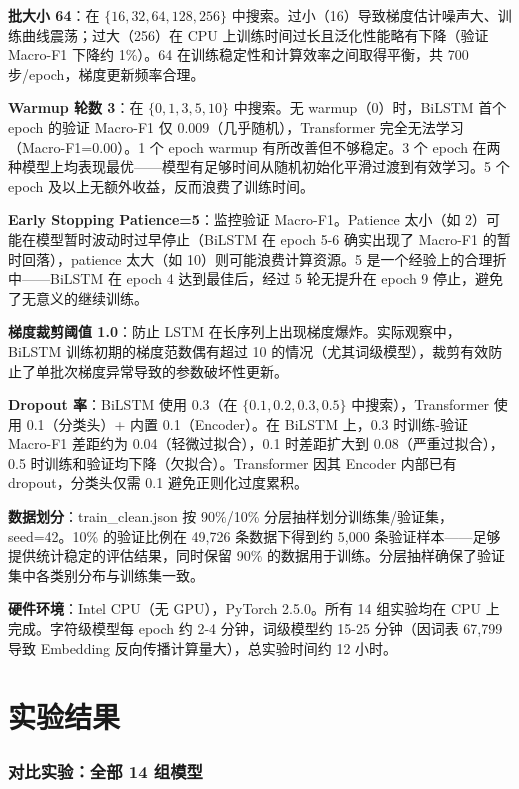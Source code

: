 \textbf{批大小 64}：在 $\{16, 32, 64, 128, 256\}$ 中搜索。过小（16）导致梯度估计噪声大、训练曲线震荡；过大（256）在 CPU 上训练时间过长且泛化性能略有下降（验证 Macro-F1 下降约 1\%）。64 在训练稳定性和计算效率之间取得平衡，共 700 步/epoch，梯度更新频率合理。

\textbf{Warmup 轮数 3}：在 $\{0, 1, 3, 5, 10\}$ 中搜索。无 warmup（0）时，BiLSTM 首个 epoch 的验证 Macro-F1 仅 0.009（几乎随机），Transformer 完全无法学习（Macro-F1=0.00）。1 个 epoch warmup 有所改善但不够稳定。3 个 epoch 在两种模型上均表现最优——模型有足够时间从随机初始化平滑过渡到有效学习。5 个 epoch 及以上无额外收益，反而浪费了训练时间。

\textbf{Early Stopping Patience=5}：监控验证 Macro-F1。Patience 太小（如 2）可能在模型暂时波动时过早停止（BiLSTM 在 epoch 5-6 确实出现了 Macro-F1 的暂时回落），patience 太大（如 10）则可能浪费计算资源。5 是一个经验上的合理折中——BiLSTM 在 epoch 4 达到最佳后，经过 5 轮无提升在 epoch 9 停止，避免了无意义的继续训练。

\textbf{梯度裁剪阈值 1.0}：防止 LSTM 在长序列上出现梯度爆炸。实际观察中，BiLSTM 训练初期的梯度范数偶有超过 10 的情况（尤其词级模型），裁剪有效防止了单批次梯度异常导致的参数破坏性更新。

\textbf{Dropout 率}：BiLSTM 使用 0.3（在 $\{0.1,0.2,0.3,0.5\}$ 中搜索），Transformer 使用 0.1（分类头）+ 内置 0.1（Encoder）。在 BiLSTM 上，0.3 时训练-验证 Macro-F1 差距约为 0.04（轻微过拟合），0.1 时差距扩大到 0.08（严重过拟合），0.5 时训练和验证均下降（欠拟合）。Transformer 因其 Encoder 内部已有 dropout，分类头仅需 0.1 避免正则化过度累积。

\textbf{数据划分}：train\_clean.json 按 90\%/10\% 分层抽样划分训练集/验证集，seed=42。10\% 的验证比例在 49,726 条数据下得到约 5,000 条验证样本——足够提供统计稳定的评估结果，同时保留 90\% 的数据用于训练。分层抽样确保了验证集中各类别分布与训练集一致。

\textbf{硬件环境}：Intel CPU（无 GPU），PyTorch 2.5.0\cite{pytorch}。所有 14 组实验均在 CPU 上完成。字符级模型每 epoch 约 2-4 分钟，词级模型约 15-25 分钟（因词表 67,799 导致 Embedding 反向传播计算量大），总实验时间约 12 小时。

\chapter{实验结果}

\subsection{对比实验：全部 14 组模型}

